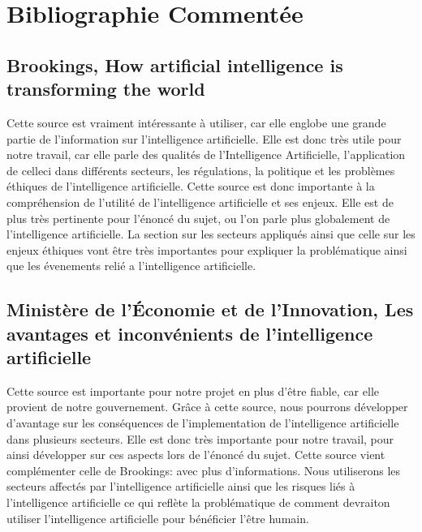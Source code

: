 \documentclass[letterpaper,10pt,french]{sphinxmanual}
\begin{document}
\section{Bibliographie Commentée}
\label{\detokenize{biblio_commented:bibliographie-commentee}}\label{\detokenize{biblio_commented::doc}}

\subsection{Brookings, How artificial intelligence is transforming the world}
\label{\detokenize{biblio_commented:brookings-how-artificial-intelligence-is-transforming-the-world}}
Cette source est vraiment intéressante à utiliser, car elle englobe une
grande partie de l’information sur l’intelligence artificielle. Elle est donc très utile pour notre
travail, car elle parle des qualités de l’Intelligence Artificielle, l’application de
celle\sphinxhyphen{}ci dans différents secteurs, les régulations, la politique et les problèmes éthiques de
l’intelligence artificielle. Cette source est donc importante à la compréhension de l’utilité
de l’intelligence artificielle et ses enjeux. Elle est de plus très pertinente pour l’énoncé du sujet,
ou l’on parle plus globalement de l’intelligence artificielle. La section sur les secteurs appliqués
ainsi que celle sur les enjeux éthiques vont être très importantes pour expliquer la problématique
ainsi que les évenements relié a l’intelligence artificielle.


\subsection{Ministère de l’Économie et de l’Innovation, Les avantages et inconvénients de l’intelligence artificielle}
\label{\detokenize{biblio_commented:ministere-de-l-economie-et-de-l-innovation-les-avantages-et-inconvenients-de-l-intelligence-artificielle}}
Cette source est importante pour notre projet en plus d’être fiable,
car elle provient de notre gouvernement. Grâce à cette source, nous pourrons développer d’avantage
sur les conséquences de l’implementation de l’intelligence artificielle dans plusieurs secteurs.
Elle est donc très importante pour notre travail, pour ainsi développer sur ces aspects lors de l’énoncé du sujet.
Cette source vient complémenter celle de Brookings: 
avec plus d’informations. Nous utiliserons les secteurs affectés par l’intelligence artificielle ainsi
que les risques liés à l’intelligence artificielle ce qui reflète la problématique de comment devrait\sphinxhyphen{}on
utiliser l’intelligence artificielle pour bénéficier l’être humain.
\end{document}
